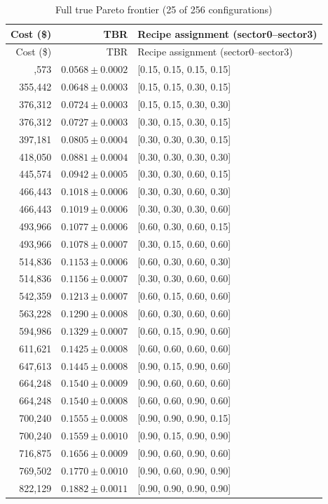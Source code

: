 \documentclass[11pt]{article}
\begin{document}
\begin{longtable}{rrl}
\caption{Full true Pareto frontier (25 of 256 configurations)}\label{t:pareto}\\
\toprule
Cost (\$) & TBR & Recipe assignment (sector0--sector3) \\
\midrule
\endfirsthead
\toprule
Cost (\$) & TBR & Recipe assignment (sector0--sector3) \\
\midrule
\endhead
\bottomrule
\endfoot
334,573 & $0.0568\pm0.0002$ & [0.15, 0.15, 0.15, 0.15] \\
355,442 & $0.0648\pm0.0003$ & [0.15, 0.15, 0.30, 0.15] \\
376,312 & $0.0724\pm0.0003$ & [0.15, 0.15, 0.30, 0.30] \\
376,312 & $0.0727\pm0.0003$ & [0.30, 0.15, 0.30, 0.15] \\
397,181 & $0.0805\pm0.0004$ & [0.30, 0.30, 0.30, 0.15] \\
418,050 & $0.0881\pm0.0004$ & [0.30, 0.30, 0.30, 0.30] \\
445,574 & $0.0942\pm0.0005$ & [0.30, 0.30, 0.60, 0.15] \\
466,443 & $0.1018\pm0.0006$ & [0.30, 0.30, 0.60, 0.30] \\
466,443 & $0.1019\pm0.0006$ & [0.30, 0.30, 0.30, 0.60] \\
493,966 & $0.1077\pm0.0006$ & [0.60, 0.30, 0.60, 0.15] \\
493,966 & $0.1078\pm0.0007$ & [0.30, 0.15, 0.60, 0.60] \\
514,836 & $0.1153\pm0.0006$ & [0.60, 0.30, 0.60, 0.30] \\
514,836 & $0.1156\pm0.0007$ & [0.30, 0.30, 0.60, 0.60] \\
542,359 & $0.1213\pm0.0007$ & [0.60, 0.15, 0.60, 0.60] \\
563,228 & $0.1290\pm0.0008$ & [0.60, 0.30, 0.60, 0.60] \\
594,986 & $0.1329\pm0.0007$ & [0.60, 0.15, 0.90, 0.60] \\
611,621 & $0.1425\pm0.0008$ & [0.60, 0.60, 0.60, 0.60] \\
647,613 & $0.1445\pm0.0008$ & [0.90, 0.15, 0.90, 0.60] \\
664,248 & $0.1540\pm0.0009$ & [0.90, 0.60, 0.60, 0.60] \\
664,248 & $0.1540\pm0.0008$ & [0.60, 0.60, 0.90, 0.60] \\
700,240 & $0.1555\pm0.0008$ & [0.90, 0.90, 0.90, 0.15] \\
700,240 & $0.1559\pm0.0010$ & [0.90, 0.15, 0.90, 0.90] \\
716,875 & $0.1656\pm0.0009$ & [0.90, 0.60, 0.90, 0.60] \\
769,502 & $0.1770\pm0.0010$ & [0.90, 0.60, 0.90, 0.90] \\
822,129 & $0.1882\pm0.0011$ & [0.90, 0.90, 0.90, 0.90] \\
\end{longtable}
\end{document}
